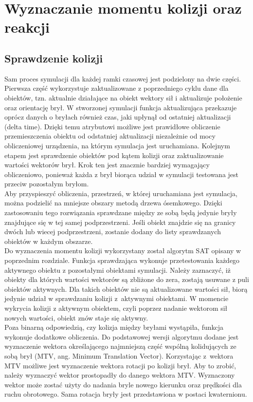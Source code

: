 \chapter{Wyznaczanie momentu kolizji oraz reakcji}

\section{Sprawdzenie kolizji}
Sam proces symulacji dla każdej ramki czasowej jest podzielony na dwie części. Pierwsza część wykorzystuje zaktualizowane z poprzedniego cyklu dane dla obiektów, tzn. aktualnie działające na obiekt wektory sił i aktualizuje położenie oraz orientację brył. W stworzonej symulacji funkcja aktualizująca przekazuje oprócz danych o bryłach również czas, jaki upłynął od ostatniej aktualizacji (delta time). Dzięki temu atrybutowi możliwe jest prawidłowe obliczenie przemieszczenia obiektu od odstatniej aktualizacji niezależnie od mocy obliczeniowej urządzenia, na którym symulacja jest uruchamiana. Kolejnym etapem jest sprawdzenie obiektów pod kątem kolizji oraz zaktualizowanie wartości wektorów brył. Krok ten jest znacznie bardziej wymagający obliczeniowo, ponieważ każda z brył biorąca udział w symulacji testowana jest przeciw pozostałym bryłom. \\
Aby przyspieszyć obliczenia, przestrzeń, w której uruchamiana jest symulacja, można podzielić na mniejsze obszary metodą drzewa ósemkowego. Dzięki zastosowaniu tego rozwiązania sprawdzane między ze sobą będą jedynie bryły znajdujące się w tej samej podprzestrzeni. Jeśli obiekt znajdzie się na granicy dwóch lub wiecej podprzestrzeni, zostanie dodany do listy sprawdzanych obiektów w każdym obszarze.\\
Do wyznaczenia momentu kolizji wykorzystany został algorytm SAT opisany w poprzednim rozdziale. Funkcja sprawdzająca wykonuje przetestowania każdego aktywnego obiektu z pozostałymi obiektami symulacji. Należy zaznaczyć, iż obiekty dla których wartości wektorów są zbliżone do zera, zostają usuwane z puli obiektów aktywnych. Dla takich obiektów nie są aktualizowane wartości sił, biorą jedynie udział w sprawdzaniu kolizji z~aktywnymi obiektami. W momencie wykrycia kolizji z aktywnym obiektem, czyli poprzez nadanie wektorom sił nowych wartości, obiekt znów staje się aktywny.
\\Poza binarną odpowiedzią, czy kolizja między bryłami wystąpiła, funkcja wykonuje dodatkowe obliczenia. Do podstawowej wersji algorytmu dodane jest wyznaczenie wektora określającego najmniejszą część wspólną kolidujących ze sobą brył (MTV, ang. Minimum Translation Vector).
Korzystając z~wektora MTV możliwe jest wyznaczenie wektora rotacji po kolizji brył. Aby to zrobić, należy wyznaczyć  wektor prostopadły do danego wektora MTV. Wyznaczony wektor może zostać użyty do nadania bryle nowego kierunku oraz prędkości dla ruchu obrotowego. Sama rotacja bryły jest przedstawiona w postaci kwaternionu.\\


